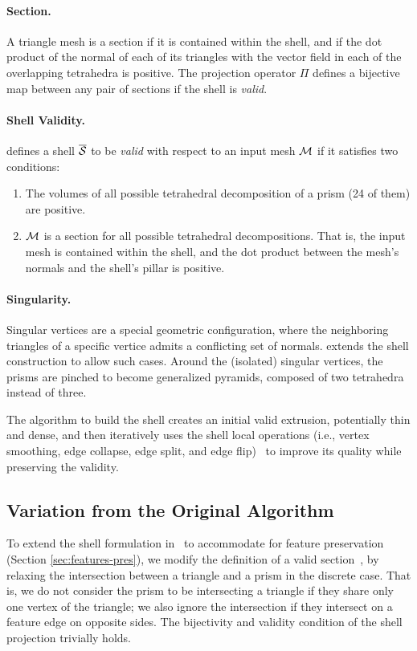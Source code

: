 \paragraph{Section.} A triangle mesh is a section if it is contained within the shell, and if the dot product of the normal of each of its triangles with the vector field in each of the overlapping tetrahedra is positive. The projection operator $\Pi$ defines a bijective map between any pair of sections if the shell is \emph{valid}.

\paragraph{Shell Validity.}
\cite{jiang2020bijective} defines a shell $\overline{\mathcal{S}}$ to be \emph{valid} with respect to an input mesh $\mathcal{M}$ if it satisfies two conditions:
\begin{enumerate}
    \item The volumes of all possible tetrahedral decomposition of a prism (24 of them) are positive.
    \item $\mathcal{M}$ is a section for all possible tetrahedral decompositions. That is, the input mesh is contained within the shell, and the dot product between the mesh's normals and the shell's pillar is positive. 
\end{enumerate}

\paragraph{Singularity.}
Singular vertices are a special geometric configuration, where the neighboring triangles of a specific {vertice} admits {a} conflicting set of normals. 
\cite{jiang2020bijective} extends the shell construction to allow such cases. Around the (isolated) singular vertices, the prisms are pinched to become generalized pyramids, composed of two tetrahedra instead of three.


The algorithm to build the shell creates an initial valid extrusion, potentially thin and dense, and then iteratively uses the shell local operations (i.e., vertex smoothing, edge collapse, edge split, and edge flip)~\cite[Section 3.4]{jiang2020bijective} to improve its quality while preserving the validity.


\subsection{Variation from the Original Algorithm}
To extend the shell formulation in~\cite{jiang2020bijective} to accommodate for feature preservation (Section \ref{sec:features-pres}), we modify the definition of a valid section~\cite[Definition 3.1]{jiang2020bijective}, by relaxing the intersection between a triangle and a prism in the discrete case. That is, we do not consider the prism to be intersecting a triangle if they share only one vertex of the triangle; we also ignore the intersection if they intersect on a feature edge on opposite sides. The bijectivity and validity condition of the shell projection trivially holds.

